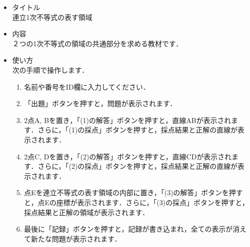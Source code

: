 \documentclass[20]{jarticle}
\begin{document}
\begin{itemize}
\item タイトル\\
連立1次不等式の表す領域

\item 内容\\
２つの1次不等式の領域の共通部分を求める教材です．

\item 使い方\\
次の手順で操作します．
\begin{enumerate}[(1)]
\item 名前や番号をID欄に入力してください．
\item 「出題」ボタンを押すと，問題が表示されます．
\item 2点A, Bを置き，「(1)の解答」ボタンを押すと，直線ABが表示されます．さらに，「(1)の採点」ボタンを押すと，採点結果と正解の直線が表示されます．
\item 2点C, Dを置き，「(2)の解答」ボタンを押すと，直線CDが表示されます．さらに，「(2)の採点」ボタンを押すと，採点結果と正解の直線が表示されます．
\item 点Eを連立不等式の表す領域の内部に置き，「(3)の解答」ボタンを押すと，点Eの座標が表示されます．さらに，「(3)の採点」ボタンを押すと，採点結果と正解の領域が表示されます．
\item 最後に「記録」ボタンを押すと，記録が書き込まれ，全ての表示が消えて新たな問題が表示されます．
\end{enumerate}

\end{itemize}
\end{document}
